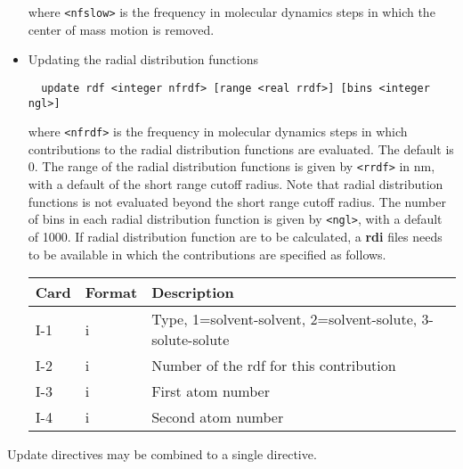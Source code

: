 \begin{itemize}
where \verb+<nfslow>+ is the frequency in molecular dynamics steps in
which the center of mass motion is removed.
\item
Updating the radial distribution functions
\begin{verbatim}
  update rdf <integer nfrdf> [range <real rrdf>] [bins <integer ngl>]
\end{verbatim}
where \verb+<nfrdf>+ is the frequency in molecular dynamics steps in 
which contributions to the radial distribution functions are
evaluated. The default is 0. The range of the radial distribution
functions is given by \verb+<rrdf>+ in nm, with a default of the short
range cutoff radius. Note that radial distribution functions is not
evaluated beyond the short range cutoff radius. The number of
bins in each radial distribution function is given by \verb+<ngl>+, with
a default of 1000.
If radial distribution function are to be
calculated, a {\bf rdi} files needs to be available in which the
contributions are specified as follows.
\begin{center}
\begin{tabular}{lll}
\hline\hline
Card & Format & Description \\ \hline
I-1  & i & Type, 1=solvent-solvent, 2=solvent-solute,
3-solute-solute\\
I-2  & i & Number of the rdf for this contribution\\
I-3  & i & First atom number \\
I-4  & i & Second atom number \\ 
\hline
\end{tabular}
\end{center}
\end{itemize}
Update directives may be combined to a single directive.

